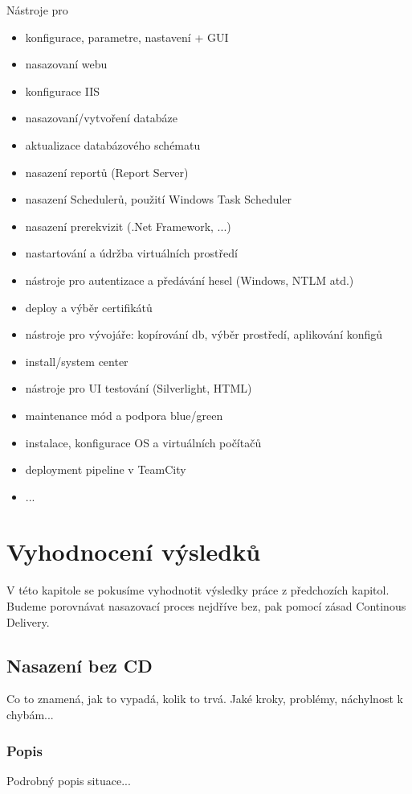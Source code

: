 Nástroje pro
\begin{itemize}
  \item konfigurace, parametre, nastavení + GUI
  \item nasazovaní webu
  \item konfigurace IIS
  \item nasazovaní/vytvoření databáze
  \item aktualizace databázového schématu
  \item nasazení reportů (Report Server)
  \item nasazení Schedulerů, použití Windows Task Scheduler
  \item nasazení prerekvizit (.Net Framework, ...)
  \item nastartování a údržba virtuálních prostředí
  \item nástroje pro autentizace a předávání hesel (Windows, NTLM atd.)
  \item deploy a výběr certifikátů
  \item nástroje pro vývojáře: kopírování db, výběr prostředí, aplikování konfigů
  \item install/system center
  \item nástroje pro UI testování (Silverlight, HTML)
  \item maintenance mód a podpora blue/green
  \item instalace, konfigurace OS a virtuálních počítačů
  \item deployment pipeline v TeamCity  
  \item ...
\end{itemize}

\chapter{Vyhodnocení výsledků}
\label{ch:vyslekdy}
V této kapitole se pokusíme vyhodnotit výsledky práce z předchozích kapitol. Budeme porovnávat nasazovací proces nejdříve bez, pak pomocí zásad Continous Delivery. 

\section{Nasazení bez CD}
Co to znamená, jak to vypadá, kolik to trvá. Jaké kroky, problémy, náchylnost k chybám...

\subsection{Popis}
Podrobný popis situace...

